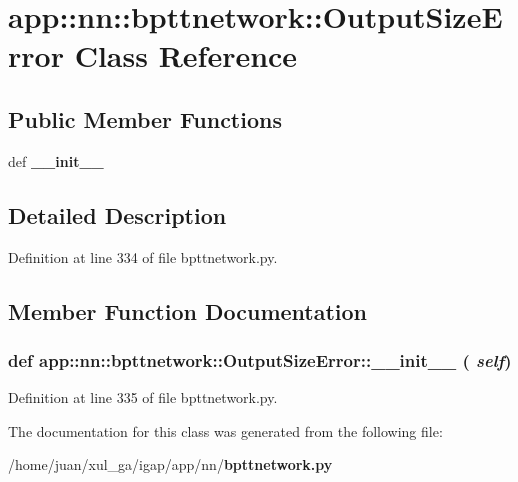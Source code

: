 \section{app::nn::bpttnetwork::OutputSizeError Class Reference}
\label{classapp_1_1nn_1_1bpttnetwork_1_1OutputSizeError}
\subsection*{Public Member Functions}
\begin{CompactItemize}
\item 
def {\bf \_\-\_\-init\_\-\_\-}
\end{CompactItemize}


\subsection{Detailed Description}


Definition at line 334 of file bpttnetwork.py.

\subsection{Member Function Documentation}
\subsubsection{\setlength{\rightskip}{0pt plus 5cm}def app::nn::bpttnetwork::OutputSizeError::\_\-\_\-init\_\-\_\- ( {\em self})}\label{classapp_1_1nn_1_1bpttnetwork_1_1OutputSizeError_da29285d7931673f89b5ade6808e1f8b}




Definition at line 335 of file bpttnetwork.py.

The documentation for this class was generated from the following file:\begin{CompactItemize}
\item 
/home/juan/xul\_\-ga/igap/app/nn/{\bf bpttnetwork.py}\end{CompactItemize}
